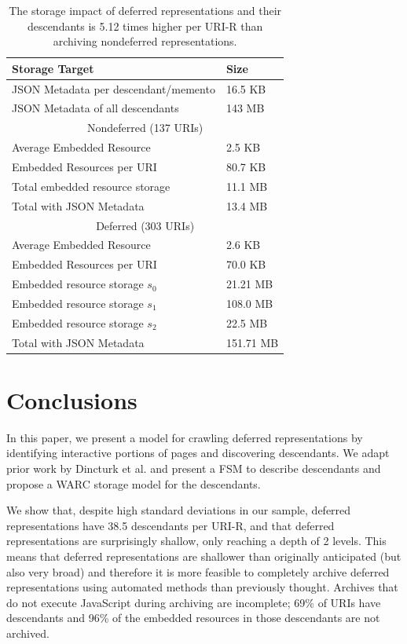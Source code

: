 \documentclass{sig-alternate}
\begin{document}
\begin{table}
\centering
\begin{tabular}{p{5cm} | p{2cm}}
\textbf{Storage Target} & \textbf{Size} \\
\hline
\hline
JSON Metadata per descendant/memento & 16.5 KB \\
JSON Metadata of all descendants & 143 MB \\
\hline 
\multicolumn{2}{c}{Nondeferred (137 URIs)}\\
\hline
Average Embedded Resource & 2.5 KB\\
Embedded Resources per URI & 80.7 KB\\
Total embedded resource storage & 11.1 MB\\
Total with JSON Metadata & 13.4 MB\\
\hline 
\multicolumn{2}{c}{Deferred (303 URIs)}\\
\hline
Average Embedded Resource & 2.6 KB\\
Embedded Resources per URI & 70.0 KB\\
Embedded resource storage $s_0$ & 21.21 MB\\
Embedded resource storage $s_1$ & 108.0 MB\\
Embedded resource storage $s_2$ & 22.5 MB\\
Total with JSON Metadata & 151.71 MB \\
\hline
\end{tabular}
  \caption{The storage impact of deferred representations and their descendants is 5.12 times higher per URI-R than archiving nondeferred representations.}
  \label{storages}
\end{table}


\section{Conclusions}
In this paper, we present a model for crawling deferred representations by identifying interactive portions of pages and discovering descendants. We adapt prior work by Dincturk et al. and present a FSM to describe descendants and propose a WARC storage model for the descendants.

We show that, despite high standard deviations in our sample, deferred representations have 38.5 descendants per URI-R, and that deferred representations are surprisingly shallow, only reaching a depth of 2 levels. This means that deferred representations are shallower than originally anticipated (but also very broad) and therefore it is more feasible to completely archive deferred representations using automated methods than previously thought. Archives that do not execute JavaScript during archiving are incomplete; 69\% of URIs have descendants and 96\% of the embedded resources in those descendants are not archived.
\end{document}
